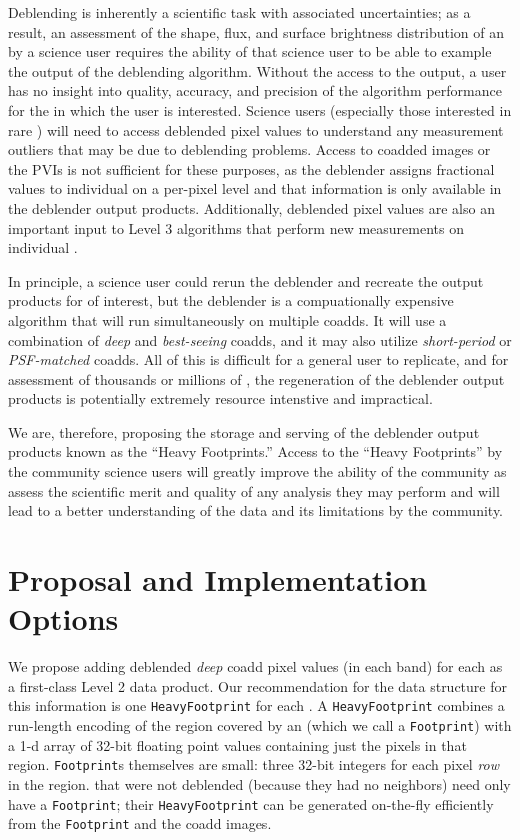 \documentclass[DM,toc]{lsstdoc}
\begin{document}
Deblending is inherently a scientific task with associated uncertainties; as a result, an assessment of the shape, flux, and surface brightness distribution of an \Object by a science user requires the ability of that science user to be able to example the output of the deblending algorithm.  Without the access to the output, a user has no insight into quality, accuracy, and precision of the algorithm performance for the \Objects in which the user is interested.  Science users (especially those interested in rare \Objects) will need to access deblended pixel values to understand any measurement outliers that may be due to deblending problems.  Access to coadded images or the PVIs is not sufficient for these purposes, as the deblender assigns fractional values to individual \Objects on a per-pixel level and that information is only available in the deblender output products.  Additionally, deblended pixel values are also an important input to Level 3 algorithms that perform new measurements on individual \Objects.

In principle, a science user could rerun the deblender and recreate the output products for \Objects of interest, but the deblender is a compuationally expensive algorithm that will run simultaneously on multiple coadds.  It will use a combination of \emph{deep} and \emph{best-seeing} coadds, and it may also utilize \emph{short-period} or \emph{PSF-matched} coadds.  All of this is difficult for a general user to replicate, and for assessment of thousands or millions of \Objects, the regeneration of the deblender output products is potentially extremely resource intenstive and impractical.

We are, therefore, proposing the storage and serving of the deblender output products known as the ``Heavy Footprints.''  Access to the ``Heavy Footprints'' by the community science users will greatly improve the ability of the community as assess the scientific merit and quality of any analysis they may perform and will lead to a better understanding of the data and its limitations by the community.

\section{Proposal and Implementation Options}

We propose adding deblended \emph{deep} coadd pixel values (in each band) for each \Object as a first-class Level 2 data product.  Our recommendation for the data structure for this information is one \texttt{HeavyFootprint} for each \Object.  A \texttt{HeavyFootprint} combines a run-length encoding of the region covered by an \Object (which we call a \texttt{Footprint}) with a 1-d array of 32-bit floating point values containing just the pixels in that region.  \texttt{Footprint}s themselves are small: three 32-bit integers for each pixel \emph{row} in the region.  \Objects that were not deblended (because they had no neighbors) need only have a \texttt{Footprint}; their \texttt{HeavyFootprint} can be generated on-the-fly efficiently from the \texttt{Footprint} and the coadd images.
\end{document}
